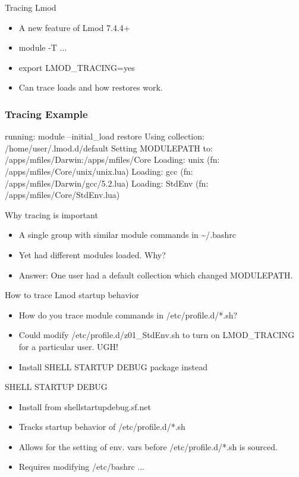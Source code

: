 \documentclass{beamer}
\begin{document}
\begin{frame}{Tracing Lmod}
  \begin{itemize}
    \item A new feature of Lmod 7.4.4+
    \item module -T ...
    \item export LMOD\_TRACING=yes
    \item Can trace loads and how restores work.
  \end{itemize}
\end{frame}

\begin{frame}[fragile]
    \frametitle{Tracing Example}
  {\tiny
    \begin{semiverbatim}
running: module --initial\_load restore
  Using collection:      /home/user/.lmod.d/default
  Setting MODULEPATH to: /apps/mfiles/Darwin:/apps/mfiles/Core
  Loading: unix (fn: /apps/mfiles/Core/unix/unix.lua)
  Loading: gcc (fn: /apps/mfiles/Darwin/gcc/5.2.lua)
  Loading: StdEnv (fn: /apps/mfiles/Core/StdEnv.lua)
    \end{semiverbatim}
}
\end{frame}

\begin{frame}{Why tracing is important}
  \begin{itemize}
    \item A single group with similar module commands in \textasciitilde/.bashrc
    \item Yet had different modules loaded. Why?
    \item Answer: One user had a default collection which changed MODULEPATH.
  \end{itemize}
\end{frame}

\begin{frame}{How to trace Lmod startup behavior}
  \begin{itemize}
    \item How do you trace module commands in /etc/profile.d/*.sh?
    \item Could modify /etc/profile.d/z01\_StdEnv.sh to turn on
      LMOD\_TRACING for a particular user. UGH!
    \item Install SHELL STARTUP DEBUG package instead
  \end{itemize}
\end{frame}

\begin{frame}{SHELL STARTUP DEBUG}
  \begin{itemize}
    \item Install from shellstartupdebug.sf.net
    \item Tracks startup behavior of /etc/profile.d/*.sh
    \item Allows for the setting of env. vars before
      /etc/profile.d/*.sh is sourced.
    \item Requires modifying /etc/bashrc ...
  \end{itemize}
\end{frame}
\end{document}
